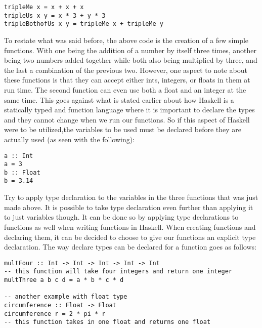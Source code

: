 \documentclass{article}
\begin{document}
\medskip\noindent %

\begin{lstlisting}
tripleMe x = x + x + x
tripleUs x y = x * 3 + y * 3
tripleBothofUs x y = tripleMe x + tripleMe y
\end{lstlisting}
To restate what was said before, the above code is the creation of a few simple functions. 
With one being the addition of a number by itself three times, another being two numbers added together while both also being multiplied by three, and the last a combination of the previous two.
However, one aspect to note about these functions is that they can accept either ints, integers, or floats in them at run time.
The second function can even use both a float and an integer at the same time.
This goes against what is stated earlier about how Haskell is a statically typed and function language where it is important to declare the types and they cannot change when we run our functions.
So if  this aspect of Haskell were to be utilized,the variables to be used must be declared before they are actually used (as seen with the following):
\begin{lstlisting}
a :: Int
a = 3
b :: Float
b = 3.14
\end{lstlisting}
Try to apply type declaration to the variables in the three functions that was just made above.
It is possible to take type declaration even further than applying it to just variables though.
It can be done so by applying type declarations to functions as well when writing  functions in Haskell.
When creating  functions and declaring them, it can be decided to choose to give our functions an explicit type declaration.
The way  declare types can be declared for a function goes as follows:
\begin{lstlisting}
multFour :: Int -> Int -> Int -> Int -> Int
-- this function will take four integers and return one integer
multThree a b c d = a * b * c * d

-- another example with float type
circumference :: Float -> Float
circumference r = 2 * pi * r
-- this function takes in one float and returns one float
\end{lstlisting}
\end{document}
